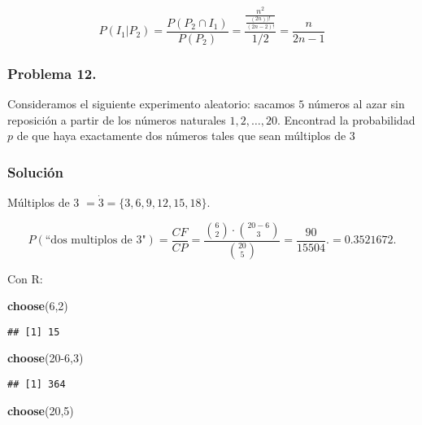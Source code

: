\documentclass[
]{article}
\newenvironment{Shaded}{\begin{snugshade}}{\end{snugshade}}
\newcommand{\DecValTok}[1]{\textcolor[rgb]{0.00,0.00,0.81}{#1}}
\newcommand{\KeywordTok}[1]{\textcolor[rgb]{0.13,0.29,0.53}{\textbf{#1}}}
\newcommand{\NormalTok}[1]{#1}
\begin{document}
\[
P(I_1|P_2) = \frac{P(P_2 \cap I_1)}{P(P_2)} = \frac{\frac{n^2}{\frac{(2n))!}{(2n - 2)!}}}{1/2} = \frac{n}{2n-1}
\]

\hypertarget{problema-12.}{%
\subsubsection{Problema 12.}\label{problema-12.}}

Consideramos el siguiente experimento aleatorio: sacamos \(5\) números
al azar sin reposición a partir de los números naturales
\(1,2,\dots,20\). Encontrad la probabilidad \(p\) de que haya
exactamente dos números tales que sean múltiplos de \(3\)

\hypertarget{soluciuxf3n-9}{%
\subsubsection{Solución}\label{soluciuxf3n-9}}

Múltiplos de 3 \(=\dot 3= \{3, 6, 9, 12, 15, 18\}.\)

\[
P(\mbox{``dos multiplos de 3"} )=\frac{CF}{CP}=\frac{{6\choose2}\cdot{{20-6}\choose {3}}}{{20\choose 5}}=\frac{90}{ 15504}.=0.3521672.
\]

Con R:

\begin{Shaded}
\begin{Highlighting}[]
\KeywordTok{choose}\NormalTok{(}\DecValTok{6}\NormalTok{,}\DecValTok{2}\NormalTok{)}
\end{Highlighting}
\end{Shaded}

\begin{verbatim}
## [1] 15
\end{verbatim}

\begin{Shaded}
\begin{Highlighting}[]
\KeywordTok{choose}\NormalTok{(}\DecValTok{20-6}\NormalTok{,}\DecValTok{3}\NormalTok{)}
\end{Highlighting}
\end{Shaded}

\begin{verbatim}
## [1] 364
\end{verbatim}

\begin{Shaded}
\begin{Highlighting}[]
\KeywordTok{choose}\NormalTok{(}\DecValTok{20}\NormalTok{,}\DecValTok{5}\NormalTok{)}
\end{Highlighting}
\end{Shaded}
\end{document}
